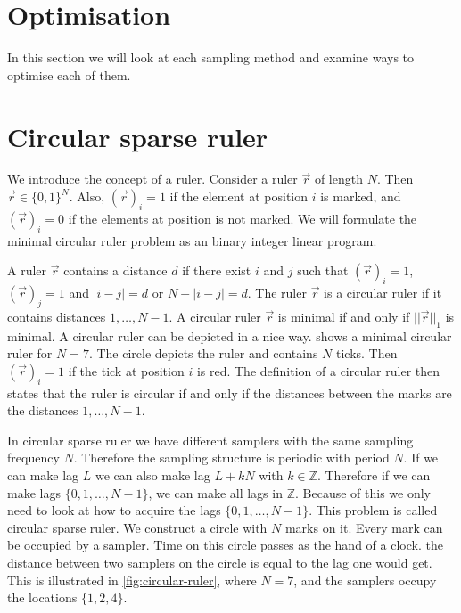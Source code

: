 \documentclass[a4paper, openany, oneside]{memoir}
\begin{document}
\section{Optimisation}
In this section we will look at each sampling method and examine ways to optimise each of them.


\section{Circular sparse ruler}
We introduce the concept of a ruler. Consider a ruler $\vec{r}$ of length $N$. Then $\vec{r} \in \{0,1\}^N$. Also, $(\vec{r})_i = 1$ if the element at position $i$ is marked, and $(\vec{r})_i = 0$ if the elements at position is not marked. We will formulate the minimal circular ruler problem as an binary integer linear program.

A ruler $\vec{r}$ contains a distance $d$ if there exist $i$ and $j$ such that $(\vec{r})_i = 1$, $(\vec{r})_j = 1$ and $|i-j| = d$ or  $N-|i-j| = d$. The ruler $\vec{r}$ is a circular ruler if it contains distances $ 1, \ldots, N - 1$. A circular ruler $\vec{r}$ is minimal if and only if $||\vec{r}||_1$ is minimal. A circular ruler can be depicted in a nice way.  shows a minimal circular ruler for $N=7$. The circle depicts the ruler and contains $N$ ticks. Then $(\vec{r})_i = 1$ if the tick at position $i$ is red. The definition of a circular ruler then states that the ruler is circular if and only if the distances between the marks are the distances $1,\ldots,N-1$.

In circular sparse ruler we have different samplers with the same sampling frequency $N$. Therefore the sampling structure is periodic with  period $N$.
If we can make lag $L$ we can also make lag $L+kN$ with $k \in \mathbb{Z}$. Therefore if we can make lags $\{0,1,\dots,N-1\}$, we can make all lags in $\mathbb{Z}$. Because of this we only need to look at how to acquire the lags $\{0,1,\dots,N-1\}$. This problem is called circular sparse ruler. We construct a circle with $N$ marks on it. Every mark can be occupied by a sampler. Time on this circle passes as the hand of a clock. the distance between two samplers on the circle is equal to the lag one would get. This is illustrated in \cref{fig:circular-ruler}, where $N=7$, and the samplers occupy the locations $\{1,2,4\}$.
\end{document}
